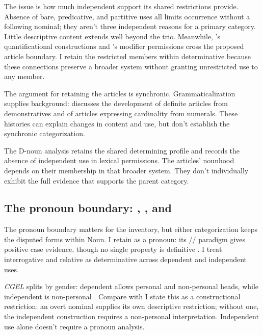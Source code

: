 \documentclass[12pt]{article}
\begin{document}
The issue is how much independent support its shared restrictions provide. Absence of bare, predicative, and partitive uses all limits occurrence without a following nominal; they aren't three independent reasons for a primary category. Little descriptive content extends well beyond the trio. Meanwhile, 's quantificational constructions and 's modifier permissions cross the proposed article boundary. I retain the restricted members within determinative because these connections preserve a broader system without granting unrestricted use to any member.

The argument for retaining the articles is synchronic. Grammaticalization supplies background: \textcite[331--336]{lyons1999} discusses the development of definite articles from demonstratives and of articles expressing cardinality from numerals. These histories can explain changes in content and use, but don't establish the synchronic categorization.

The D-noun analysis retains the shared determining profile and records the absence of independent use in lexical permissions. The articles' nounhood depends on their membership in that broader system. They don't individually exhibit the full evidence that supports the parent category.

\subsection{The pronoun boundary: , , and }\label{sec:wh-boundary}

The pronoun boundary matters for the inventory, but either categorization keeps the disputed forms within Noun. I retain  as a pronoun: its // paradigm gives positive case evidence, though no single property is definitive \citep[904--905]{huddleston2002}. I treat interrogative and relative  as determinative across dependent and independent uses.

\textit{CGEL} splits  by gender: dependent  allows personal and non-personal heads, while independent  is non-personal \citep[398]{huddleston2002}. Compare  with  I state this as a constructional restriction: an overt nominal supplies its own descriptive restriction; without one, the independent construction requires a non-personal interpretation. Independent use alone doesn't require a pronoun analysis.
\end{document}
